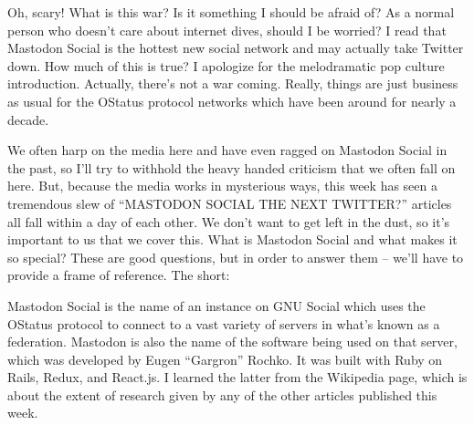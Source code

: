 Oh, scary! What is this war? Is it something I should be afraid of? As a normal person who doesn’t care about internet dives, should I be worried? I read that Mastodon Social is the hottest new social network and may actually take Twitter down. How much of this is true? I apologize for the melodramatic pop culture introduction. Actually, there’s not a war coming. Really, things are just business as usual for the OStatus protocol networks which have been around for nearly a decade.
  \autocite{knuthwebsite}

We often harp on the media here and have even ragged on Mastodon Social in the past, so I’ll try to withhold the heavy handed criticism that we often fall on here. But, because the media works in mysterious ways, this week has seen a tremendous slew of “MASTODON SOCIAL THE NEXT TWITTER?” articles all fall within a day of each other. We don’t want to get left in the dust, so it’s important to us that we cover this. What is Mastodon Social and what makes it so special? These are good questions, but in order to answer them – we’ll have to provide a frame of reference.
The short:

Mastodon Social is the name of an instance on GNU Social which uses the OStatus protocol to connect to a vast variety of servers in what’s known as a federation. Mastodon is also the name of the software being used on that server, which was developed by Eugen “Gargron” Rochko. It was built with Ruby on Rails, Redux, and React.js. I learned the latter from the Wikipedia page, which is about the extent of research given by any of the other articles published this week.
